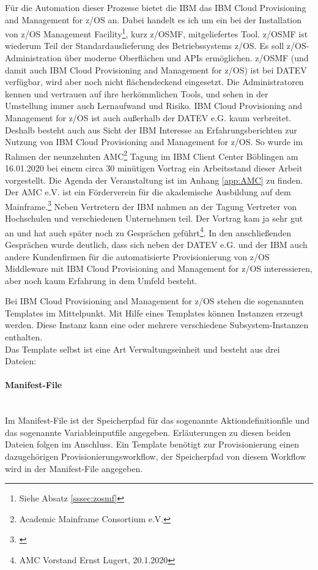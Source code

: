 Für die Automation dieser Prozesse bietet die IBM das \glqq IBM Cloud Provisioning and Management for z/OS\grqq{} an.
Dabei handelt es ich um ein bei der Installation von \glqq z/OS Management Facility\grqq{}\footnote{Siehe Absatz \ref{sssec:zosmf}}, kurz z/OSMF, mitgeliefertes Tool.
z/OSMF ist wiederum Teil der Standardauslieferung des Betriebssystems z/OS. 
Es soll z/OS-Administration über moderne Oberflächen und APIs  ermöglichen.
z/OSMF (und damit auch \glqq IBM Cloud Provisioning and Management for z/OS\grqq) ist bei DATEV verfügbar, wird aber noch nicht flächendeckend eingesetzt. Die Administratoren kennen und vertrauen auf ihre herkömmlichen Tools, und sehen in der Umstellung immer auch Lernaufwand und Risiko.
\glqq IBM Cloud Provisioning and Management for z/OS\grqq{} ist auch außerhalb der DATEV e.G. kaum verbreitet. 
Deshalb besteht auch aus Sicht der IBM  Interesse an Erfahrungsberichten zur Nutzung von \glqq IBM Cloud Provisioning and Management for z/OS\grqq.
So wurde im Rahmen der neunzehnten \glqq AMC\grqq{}\footnote{Academic Mainframe Consortium e.V.} Tagung im IBM Client Center Böblingen am 16.01.2020  bei einem circa 30 minütigen Vortrag ein Arbeitsstand dieser Arbeit vorgestellt.
Die Agenda der Veranstaltung ist im Anhang \ref{app:AMC} zu finden.
Der AMC e.V. ist ein Förderverein für die akademische Ausbildung auf dem Mainframe.\footnote{\cite{.23.2.2020}}
Neben Vertretern der IBM nahmen an der Tagung Vertreter von Hochschulen und verschiedenen Unternehmen teil.
Der Vortrag \glqq kam ja sehr gut an und hat auch später noch zu Gesprächen geführt\grqq\footnote{AMC Vorstand Ernst Lugert, 20.1.2020}. 
In den anschließenden Gesprächen wurde deutlich, dass sich neben der DATEV e.G. und der IBM auch andere Kundenfirmen für die automatisierte Provisionierung von z/OS Middleware mit \glqq IBM Cloud Provisioning and Management for z/OS\grqq{} interessieren, aber noch kaum Erfahrung in dem Umfeld besteht.

Bei \glqq IBM Cloud Provisioning and Management for z/OS\grqq{} stehen die sogenannten \glqq Templates\grqq{} im Mittelpunkt.
Mit Hilfe eines Templates können Instanzen erzeugt werden.
Diese Instanz kann eine oder mehrere verschiedene Subsystem-Instanzen enthalten.
\\Das Template selbst ist eine Art \glqq Verwaltungseinheit\grqq{} und besteht aus drei Dateien:

\paragraph{\glqq Manifest-File\grqq} ~\\
Im Manifest-File ist der Speicherpfad für das sogenannte \glqq Aktiondefinitionfile\grqq{} und das sogenannte \glqq Variableinputfile\grqq{} angegeben.
Erläuterungen zu diesen beiden Dateien folgen im Anschluss.
Ein Template benötigt zur Provisionierung einen dazugehörigen Provisionierungsworkflow, der Speicherpfad von diesem Workflow wird in der Manifest-File angegeben.
\cite{.26.2.2020}

